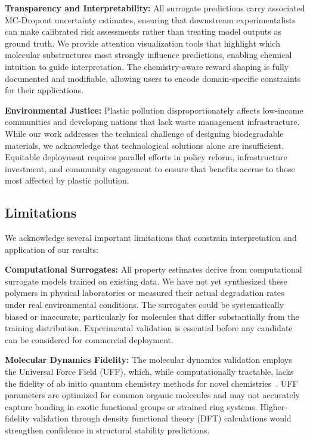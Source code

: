 \documentclass[twocolumn,10pt]{article}
\begin{document}
\textbf{Transparency and Interpretability:} All surrogate predictions carry associated MC-Dropout uncertainty estimates, ensuring that downstream experimentalists can make calibrated risk assessments rather than treating model outputs as ground truth. We provide attention visualization tools that highlight which molecular substructures most strongly influence predictions, enabling chemical intuition to guide interpretation. The chemistry-aware reward shaping is fully documented and modifiable, allowing users to encode domain-specific constraints for their applications.

\textbf{Environmental Justice:} Plastic pollution disproportionately affects low-income communities and developing nations that lack waste management infrastructure. While our work addresses the technical challenge of designing biodegradable materials, we acknowledge that technological solutions alone are insufficient. Equitable deployment requires parallel efforts in policy reform, infrastructure investment, and community engagement to ensure that benefits accrue to those most affected by plastic pollution.

\subsection{Limitations}

We acknowledge several important limitations that constrain interpretation and application of our results:

\textbf{Computational Surrogates:} All property estimates derive from computational surrogate models trained on existing data. We have not yet synthesized these polymers in physical laboratories or measured their actual degradation rates under real environmental conditions. The surrogates could be systematically biased or inaccurate, particularly for molecules that differ substantially from the training distribution. Experimental validation is essential before any candidate can be considered for commercial deployment.

\textbf{Molecular Dynamics Fidelity:} The molecular dynamics validation employs the Universal Force Field (UFF), which, while computationally tractable, lacks the fidelity of ab initio quantum chemistry methods for novel chemistries~\cite{rappe1992uff}. UFF parameters are optimized for common organic molecules and may not accurately capture bonding in exotic functional groups or strained ring systems. Higher-fidelity validation through density functional theory (DFT) calculations would strengthen confidence in structural stability predictions.
\end{document}
